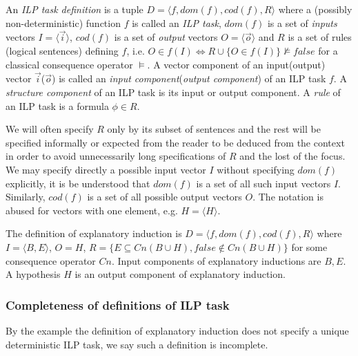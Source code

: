 \begin{defn}\label{ilp_task_definition}
An \emph{ILP task definition} is a tuple $D=\langle f, dom(f), cod(f), R \rangle$ where a (possibly non-deterministic) function $f$ is called an \emph{ILP task}, $dom(f)$ is a set of \emph{inputs} vectors
$I=\langle \overrightarrow{i} \rangle$, $cod(f)$ is a set of \emph{output} vectors $O=\langle \overrightarrow{o} \rangle$ and $R$ is a set of rules (logical sentences) defining $f$,
i.e. $O \in f(I) \iff R \cup \{O \in f(I)\} \not\models false$ for a classical consequence operator $\models$. A vector component of an input(output) vector $\overrightarrow{i}$($\overrightarrow{o}$) is called an \emph{input component}(\emph{output component}) of an ILP task $f$. A \emph{structure component} of an ILP task is its input or output component. A \emph{rule} of an ILP task is a formula $\phi \in R$.
\end{defn}

\begin{remark}
We will often specify $R$ only by its subset of sentences and the rest will be specified informally or expected from the reader to be deduced from the context in order to avoid unnecessarily long specifications of $R$ and the lost of the focus. We may specify directly a possible input vector $I$ without specifying $dom(f)$ explicitly, it is be understood that $dom(f)$ is a set of all such input vectors $I$. Similarly, $cod(f)$ is a set of all possible output vectors $O$. The notation is abused for vectors with one element, e.g. $H=\langle H \rangle$.
\end{remark}

\begin{exmp}
The definition of explanatory induction is $D=\langle f, dom(f), cod(f), R \rangle$ where $I=\langle B, E \rangle$, $O=H$, $R=\{E \subseteq Cn(B \cup H), false \not\in Cn(B \cup H)\}$ for some consequence operator $Cn$. Input components of explanatory inductions are $B, E$. A hypothesis $H$ is an output component of explanatory induction.
\end{exmp}

\subsubsection{Completeness of definitions of ILP task}
By the example  the definition of explanatory induction does not specify a unique deterministic ILP task, we say such a definition is incomplete.

